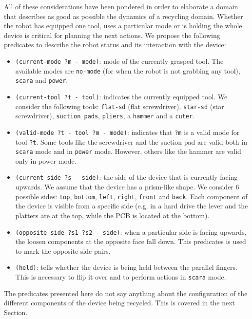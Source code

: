 \documentclass[../root.tex]{subfiles}
\begin{document}
All of these considerations have been pondered in order to elaborate a domain that
describes as good as possible the dynamics of a recycling domain. Whether the robot
has equipped one tool, uses a particular mode or is holding the whole device is
critical for planning the next actions. We propose the
following predicates to
describe the robot status and its interaction with the device:
\begin{itemize}
	\item \texttt{(current-mode ?m - mode)}: mode of the currently grasped tool. The
	available modes are \texttt{no-mode} (for when the robot is not grabbing any tool),
	\texttt{scara} and \texttt{power}.
	
	\item \texttt{(current-tool ?t - tool)}: indicates the currently equipped tool. We
	consider the following tools: \texttt{flat-sd} (flat screwdriver), \texttt{star-sd}
	(star screwdriver), \texttt{suction pads}, \texttt{pliers}, a \texttt{hammer} and a \texttt{cuter}.
	
	\item \texttt{(valid-mode ?t - tool ?m - mode)}: indicates that \texttt{?m} is a valid mode
	for tool \texttt{?t}. Some tools like the screwdriver and the suction pad are valid both
	in \texttt{scara} mode and in \texttt{power} mode. However, others like the hammer are valid only
	in power mode.
	
	\item \texttt{(current-side ?s - side)}: the side of the device that is currently facing
	upwards. We assume that the device has a prism-like shape. We consider 6 possible sides:
	\texttt{top}, \texttt{bottom}, \texttt{left}, \texttt{right}, \texttt{front} and
	\texttt{back}. Each component of the device is visible from a specific side (e.g. in a hard
	drive the lever and the platters are at the top, while the PCB is located at the bottom).
	
	\item \texttt{(opposite-side ?s1 ?s2 - side)}: when a particular side is facing upwards, the loosen components at the opposite face fall down. This predicates is used to mark the opposite side
	pairs.
	
	\item \texttt{(held)}: tells whether the device is being held between the parallel fingers.
	This is necessary to flip it over and to perform actions in \texttt{scara} mode.
\end{itemize}

The predicates presented here do not say anything about the configuration of the different components
of the device being recycled. This is covered in the next
Section.
\end{document}
